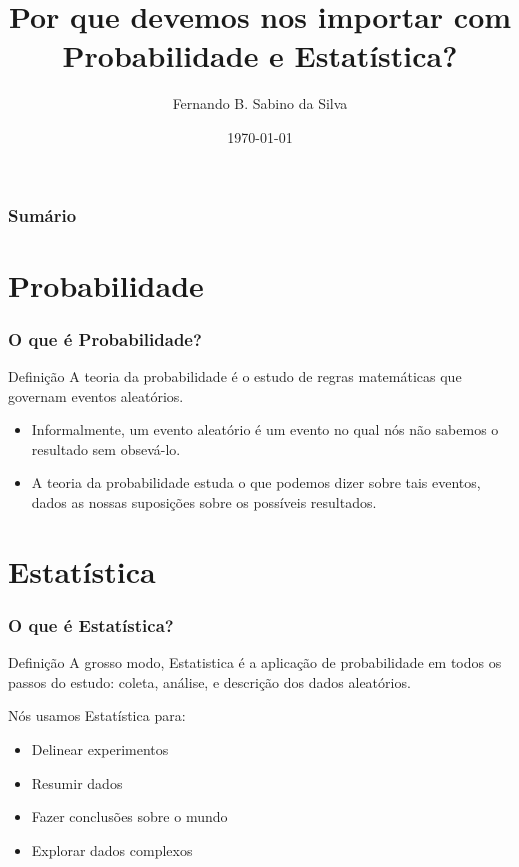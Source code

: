 \documentclass[pdf,9pt,xcolor=dvipsnames,hide notes]{beamer}\usepackage[]{graphicx}\usepackage[]{color}
\title[UFRGS]{Por que devemos nos importar com Probabilidade e Estatística?}
\author[Estatística Geral II]{Fernando B. Sabino da Silva}
\date{\today}
\begin{document}


\begin{frame}
   \titlepage
\end{frame}

\begin{frame}[plain]\frametitle{Sumário}
\tableofcontents
\end{frame}


\section{Probabilidade}

\begin{frame}\frametitle{O que é Probabilidade?}

\begin{block}{Definição}
A teoria da probabilidade é o estudo de regras matemáticas que governam eventos aleatórios.
\end{block}

  \begin{itemize}
    \item Informalmente, um evento aleatório é um evento no qual nós não sabemos o resultado sem obsevá-lo.
    \item A teoria da probabilidade estuda o que podemos dizer sobre tais eventos, dados as nossas suposições sobre os possíveis resultados.
  \end{itemize}
  \end{frame}
  
  \section{Estatística}
    
    \begin{frame}\frametitle{O que é Estatística?}

\begin{block}{Definição}
A grosso modo, Estatistica é a aplicação de probabilidade em todos os passos do estudo: coleta, análise, e descrição dos dados aleatórios.
\end{block}

Nós usamos Estatística para:
  \begin{itemize}
    \item Delinear experimentos 
    \item Resumir dados
    \item Fazer conclusões sobre o mundo
    \item Explorar dados complexos
\end{itemize}

\end{frame}
\end{document}
